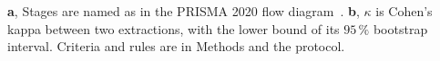 \textbf{a}, Stages are named as in the PRISMA 2020 flow diagram~\cite{Page2021}. \textbf{b}, $\kappa$ is Cohen's kappa between two extractions, with the lower bound of its $95\,\%$ bootstrap interval. Criteria and rules are in Methods and the protocol.
